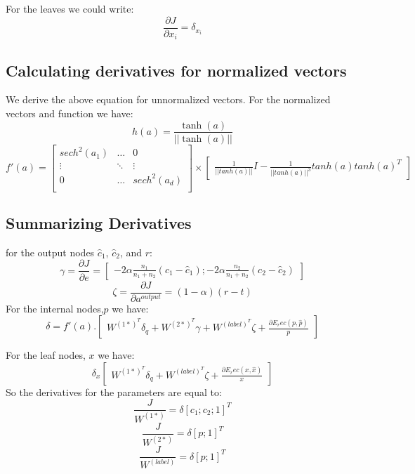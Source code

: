 \documentclass[twoside,12pt]{article}
\begin{document}
For the leaves we could write:
\begin{equation}
\frac{\partial J}{\partial x_i}=\delta_{x_i
}\end{equation}


\subsection{Calculating derivatives for normalized vectors}
We derive the above equation for unnormalized vectors. For the normalized vectors and function we have:
\begin{equation}
h(a)=\frac{\tanh(a)}{||\tanh(a)||}
\end{equation}
\begin{equation}
f'(a)=
\begin{bmatrix}
sech^2(a_1) & \ldots & 0 \\
\vdots & \ddots & \vdots \\
0 & \ldots & sech^2(a_d) \\
\end{bmatrix} \times 
\begin{bmatrix}
\frac{1}{||tanh(a)||}I-\frac{1}{||tanh(a)||^3}tanh(a)tanh(a)^T
\end{bmatrix}
\end{equation}
\subsection{Summarizing Derivatives}
for the output nodes $\hat{c}_1$, $\hat{c}_2$, and $r$:
\begin{equation}
\gamma = \frac{\partial J}{\partial e} = 
\begin{bmatrix}
-2\alpha\frac{n_1}{n_1+n_2}(c_1-\hat{c}_1);-2\alpha\frac{n_2}{n_1+n_2}(c_2-\hat{c}_2)
\end{bmatrix}
\end{equation}
\begin{equation}
\zeta = \frac{\partial J}{\partial a^{output}} = 
(1-\alpha)(r-t)
\end{equation}
For the internal nodes,$p$ we have:
\begin{equation}
\delta = f'(a).
\begin{bmatrix}
W^{{(1*)}^T}\delta_q+W^{{(2*)}^T}\gamma+W^{{(label)}^T}\zeta+\frac{\partial E_rec(p,\hat{p})}{p}
\end{bmatrix}
\end{equation}

For the leaf nodes, $x$ we have:
\begin{equation}
\delta_x
\begin{bmatrix}
W^{{(1*)}^T}\delta_q+W^{{(label)}^T}\zeta+\frac{\partial E_rec(x,\hat{x})}{x}
\end{bmatrix}
\end{equation}
So the derivatives for the parameters are equal to:
\begin{equation}
\frac{J}{W^{(1*)}}=\delta[c_1;c_2;1]^T
\end{equation}
\begin{equation}
\frac{J}{W^{(2*)}}=\delta[p;1]^T
\end{equation}
\begin{equation}
\frac{J}{W^{(label)}}=\delta[p;1]^T
\end{equation}
\end{document}
